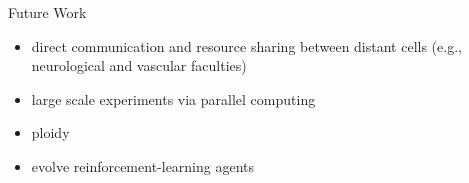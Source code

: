 \begin{block}{Future Work}
\vspace{-1ex}
{\small
\begin{itemize}
\item direct communication and resource sharing between distant cells (e.g., neurological and vascular faculties)
\item large scale experiments via parallel computing
\item ploidy
\item evolve reinforcement-learning agents
\end{itemize}
}
\vspace{-1ex}
\end{block}
